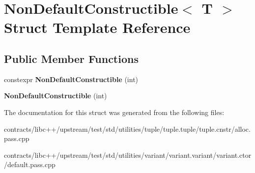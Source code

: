 \hypertarget{struct_non_default_constructible}{}\section{Non\+Default\+Constructible$<$ T $>$ Struct Template Reference}
\label{struct_non_default_constructible}
\subsection*{Public Member Functions}
\begin{DoxyCompactItemize}
\item 
\mbox{\label{struct_non_default_constructible_ad3e4cd1ea01d458abfed60a07c09351a}} 
constexpr {\bfseries Non\+Default\+Constructible} (int)
\item 
\mbox{\label{struct_non_default_constructible_a31786801a6106212947605886e03b8ad}} 
{\bfseries Non\+Default\+Constructible} (int)
\end{DoxyCompactItemize}


The documentation for this struct was generated from the following files\+:\begin{DoxyCompactItemize}
\item 
contracts/libc++/upstream/test/std/utilities/tuple/tuple.\+tuple/tuple.\+cnstr/alloc.\+pass.\+cpp\item 
contracts/libc++/upstream/test/std/utilities/variant/variant.\+variant/variant.\+ctor/default.\+pass.\+cpp\end{DoxyCompactItemize}
